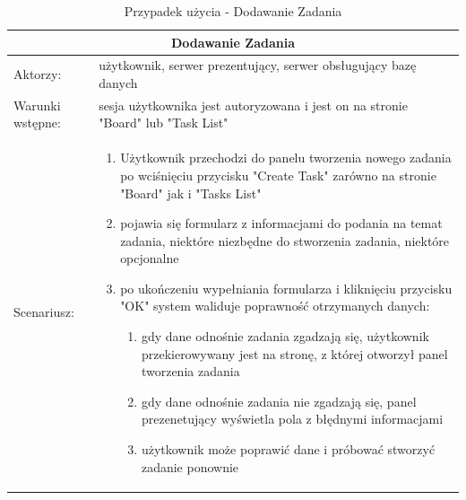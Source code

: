 \begin{table}[h!]
\begin{tabular}{ |p{2cm}||p{13cm}|  }
	
	\hline
	\multicolumn{2}{|c|}{Dodawanie Zadania} \\
	\hline
Aktorzy: &użytkownik, serwer prezentujący, serwer obsługujący bazę danych\\
	\hline
Warunki wstępne: &sesja użytkownika jest autoryzowana i jest on na stronie "Board" lub "Task List"\\
	\hline
	Scenariusz: &

\begin{enumerate}
	\item Użytkownik przechodzi do panelu tworzenia nowego zadania po wciśnięciu przycisku "Create Task" zarówno na stronie "Board" jak i "Tasks List"
	\item pojawia się formularz z informacjami do podania na temat zadania, niektóre niezbędne do stworzenia zadania, niektóre opcjonalne
	\item po ukończeniu wypełniania formularza i kliknięciu przycisku "OK" system waliduje poprawność otrzymanych danych:
	\begin{enumerate}
		\item gdy dane odnośnie zadania zgadzają się, użytkownik przekierowywany jest na stronę, z której otworzył panel tworzenia zadania
		\item gdy dane odnośnie zadania nie zgadzają się, panel prezenetujący wyświetla pola z błędnymi informacjami
		\item użytkownik może poprawić dane i próbować stworzyć zadanie ponownie
	\end{enumerate}
\end{enumerate}\\
\hline
\end{tabular}
	\caption{Przypadek użycia - Dodawanie Zadania}
\end{table}

